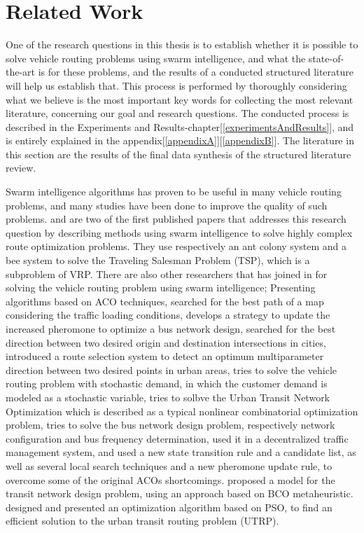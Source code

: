 \section{Related Work} 
One of the research questions in this thesis is to establish whether it is possible to solve vehicle routing problems using swarm intelligence, and what the state-of-the-art is for these problems, and the results of a conducted structured literature will help us establish that. This process is performed by thoroughly considering what we believe is the most important key words for collecting the most relevant literature, concerning our goal and research questions. The conducted process is described in the Experiments and Results-chapter[\ref{experimentsAndResults}], and is entirely explained in the appendix[\ref{appendixA}][\ref{appendixB}]. The literature in this section are the results of the final data synthesis of the structured literature review. 

Swarm intelligence algorithms has proven to be useful in many vehicle routing problems, and many studies have been done to improve the quality of such problems. \citet{dorigo97} and \citet{lucic03} are two of the first published papers that addresses this research question by describing methods using swarm intelligence to solve highly complex route optimization problems. They use respectively an ant colony system and a bee system to solve the Traveling Salesman Problem (TSP), which is a subproblem of VRP. There are also other researchers that has joined in for solving the vehicle routing problem using swarm intelligence; %
Presenting algorithms based on ACO techniques, \citet{hsiao04} searched for the best path of a map considering the traffic loading conditions, \citet{yang07} develops a strategy to update the increased pheromone to optimize a bus network design, \citet{salehi-nezhad07} searched for the best direction between two desired origin and destination intersections in cities, \citet{salehinejad10} introduced a route selection system to detect an optimum multiparameter direction between two desired points in urban areas, \citet{tripathi09} tries to solve the vehicle routing problem with stochastic demand, in which the customer demand is modeled as a stochastic variable, \citet{jiang10} tries to solbve the Urban Transit Network Optimization which is described as a typical nonlinear combinatorial optimization problem, \citet{poorzahedy11} tries to solve the bus network design problem, respectively network configuration and bus frequency determination, \citet{dias14} used it in a decentralized traffic management system, and \citet{sedighpour14} used a new state transition rule and a candidate list, as well as several local search techniques and a new pheromone update rule, to overcome some of the original ACOs shortcomings.  \citet{nikolic14} proposed a model for the transit network design problem, using an approach based on BCO metaheuristic. \citet{kechagiopoulos14} designed and presented an optimization algorithm based on PSO, to find an efficient solution to the urban transit routing problem (UTRP). 

